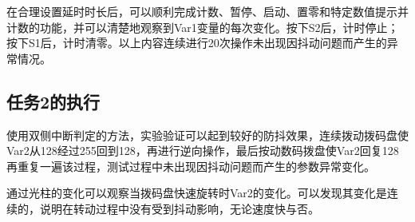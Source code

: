 \documentclass[12pt]{article}
\begin{document}
在合理设置延时时长后，可以顺利完成计数、暂停、启动、置零和特定数值提示并计数的功能，并可以清楚地观察到Var1变量的每次变化。按下S2后，计时停止；按下S1后，计时清零。以上内容连续进行20次操作未出现因抖动问题而产生的异常情况。

\subsection{任务2的执行}
\begin{figure}[htbp]
	\centering
	\centering
\end{figure}

使用双侧中断判定的方法，实验验证可以起到较好的防抖效果，连续拨动拨码盘使Var2从128经过255回到128，再进行逆向操作，最后按动数码拨盘使Var2回复128再重复一遍该过程，测试过程中未出现因抖动问题而产生的参数异常变化。

通过光柱的变化可以观察当拨码盘快速旋转时Var2的变化。可以发现其变化是连续的，说明在转动过程中没有受到抖动影响，无论速度快与否。
\end{document}
